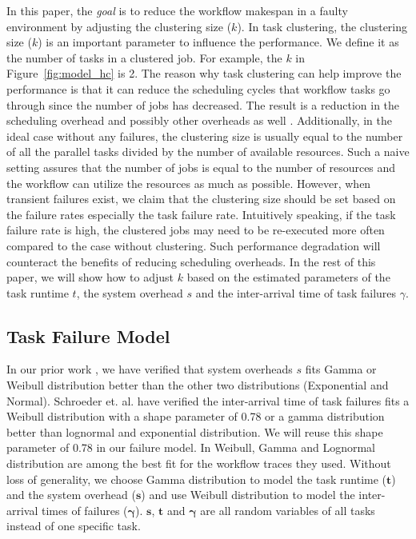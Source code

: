 \documentclass{IOS-Book-Article}
\begin{document}
In this paper, the \emph{goal} is to reduce the workflow makespan in a faulty environment by adjusting the clustering size ($k$). In task clustering, the clustering size ($k$) is an important parameter to influence the performance. We define it as the number of tasks in a clustered job. For example, the $k$ in Figure~\ref{fig:model_hc} is 2. The reason why task clustering can help improve the performance is that it can reduce the scheduling cycles that workflow tasks go through since the number of jobs has decreased. The result is a reduction in the scheduling overhead and possibly other overheads as well \cite{Chen2011}. Additionally, in the ideal case without any failures, the clustering size is usually equal to the number of all the parallel tasks divided by the number of available resources. Such a naive setting assures that the number of jobs is equal to the number of resources and the workflow can utilize the resources as much as possible. However, when transient failures exist, we claim that the clustering size should be set based on the failure rates especially the task failure rate. Intuitively speaking, if the task failure rate is high, the clustered jobs may need to be re-executed more often compared to the case without clustering. Such performance degradation will counteract the benefits of reducing scheduling overheads. In the rest of this paper, we will show how to adjust $k$ based on the estimated parameters of the task runtime $t$, the system overhead $s$ and the inter-arrival time of task failures $\gamma$. 

\subsection{Task Failure Model}




In our prior work \cite{Chen2011}, we have verified that system overheads $s$ fits Gamma or Weibull distribution better than the other two distributions (Exponential and Normal). Schroeder et. al. \cite{Schroeder2006} have verified the inter-arrival time of task failures fits a Weibull distribution with a shape parameter of 0.78 or a gamma distribution better than lognormal and exponential distribution. We will reuse this shape parameter of 0.78 in our failure model. 
In \cite{Sun2003, Iosup2008} Weibull, Gamma and Lognormal distribution are among the best fit for the workflow traces they used.  Without loss of generality, we choose Gamma distribution to model the task runtime ($\bm t$) and the system overhead ($\bm s$) and use Weibull distribution to model the inter-arrival times of failures ($\bm\gamma$).  $\bm s$, $\bm t$ and $\bm \gamma$ are all random variables of all tasks instead of one specific task. 
\end{document}
